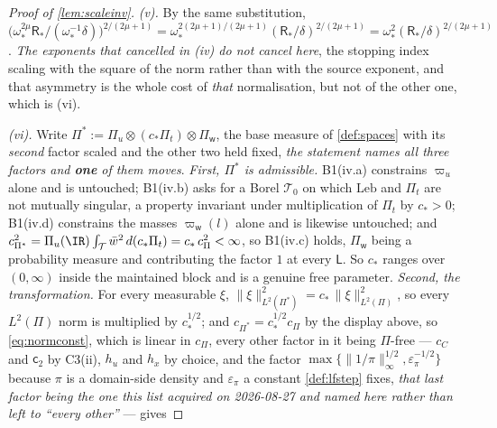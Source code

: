 \begin{proof}[Proof of \cref{lem:scaleinv}]
\emph{(v).} By the same substitution,
$\big(\omega_\ast^{2\mu}\mathsf R_\ast/(\omega_\ast^{-1}\delta)\big)^{2/(2\mu+1)}
=\omega_\ast^{2(2\mu+1)/(2\mu+1)}(\mathsf R_\ast/\delta)^{2/(2\mu+1)}
=\omega_\ast^{2}(\mathsf R_\ast/\delta)^{2/(2\mu+1)}$. \emph{The exponents that cancelled in (iv) do not
cancel here}, the stopping index scaling with the square of the norm rather than with the source
exponent, and that asymmetry is the whole cost of \emph{that} normalisation, but not of the other one,
which is (vi).

\emph{(vi).} Write $\Pi^{\ast}:=\Pi_u\otimes(c_\ast\Pi_t)\otimes\Pi_{\mathsf w}$, the base measure of
\cref{def:spaces} with its \emph{second} factor scaled and the other two held fixed, \emph{the
statement names all three factors and \textbf{one} of them moves}. \emph{First,
$\Pi^{\ast}$ is admissible.}
B1(iv.a)
constrains $\varpi_u$ alone and is untouched; B1(iv.b) asks for a Borel
$\mathcal T_0$ on which $\mathrm{Leb}$ and $\Pi_t$ are not mutually singular, a property invariant under
multiplication of $\Pi_t$ by $c_\ast>0$; B1(iv.d) constrains the masses
$\varpi_{\mathsf w}(l)$ alone and is likewise untouched; and
$c_{\Pi^{\ast}}^{2}=\Pi_u(\IR)\int_{\mathcal T}\bar w^{2}\,d(c_\ast\Pi_t)=c_\ast\,c_\Pi^{2}<\infty$, so
B1(iv.c)
holds, $\Pi_{\mathsf w}$ being a probability measure and contributing the factor $1$ at every
$\mathsf L$. So $c_\ast$ ranges over $(0,\infty)$ inside the maintained block and is a genuine free
parameter. \emph{Second, the transformation.} For every measurable $\xi$,
$\|\xi\|^{2}_{L^{2}(\Pi^{\ast})}=c_\ast\,\|\xi\|^{2}_{L^{2}(\Pi)}$, so every $L^{2}(\Pi)$ norm is
multiplied by
$c_\ast^{1/2}$; and $c_{\Pi^{\ast}}=c_\ast^{1/2}c_\Pi$ by the display above, so \eqref{eq:normconst},
which is
linear in $c_\Pi$, every other factor in it being $\Pi$-free --- $c_C$ and $\mathsf c_2$ by C3(ii),
$h_u$ and $h_x$ by choice, and the factor
$\max\{\|1/\pi\|_\infty^{1/2},\varepsilon_\pi^{-1/2}\}$ because $\pi$ is a domain-side density and
$\varepsilon_\pi$ a constant \cref{def:lfstep} fixes, \emph{that last factor being the one this list
acquired on 2026-08-27 and named here rather than left to ``every other''} --- gives

\end{proof}
